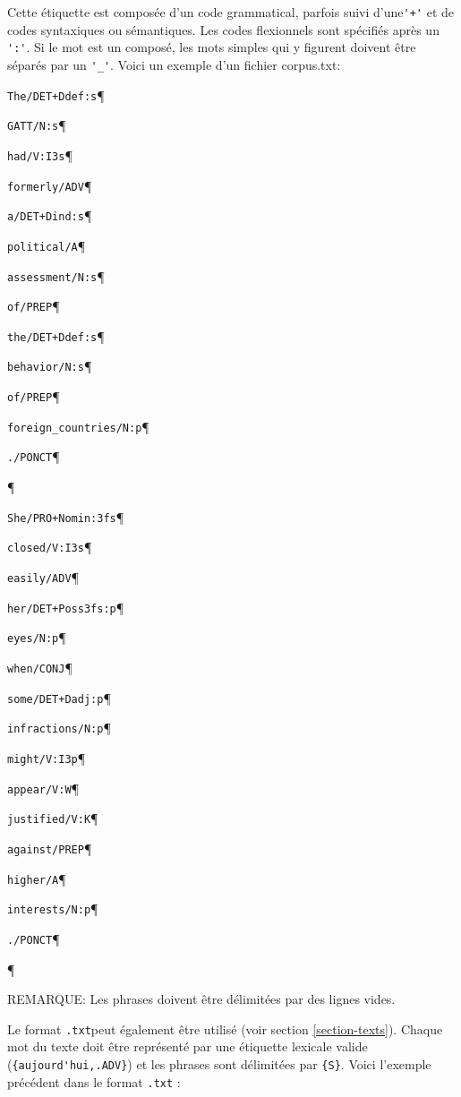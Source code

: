 Cette étiquette est composée d'un code grammatical, parfois suivi d'une\verb$'+'$ et de codes
syntaxiques ou sémantiques. Les codes flexionnels sont spécifiés après un \verb+':'+. Si le mot est
un composé, les mots simples qui y figurent doivent être séparés par un \verb+'_'+. 
Voici un exemple d'un fichier corpus.txt:

\bigskip
\verb$The/DET+Ddef:s$\P

\verb+GATT/N:s+\P

\verb+had/V:I3s+\P

\verb+formerly/ADV+\P

\verb$a/DET+Dind:s$\P

\verb+political/A+\P

\verb+assessment/N:s+\P

\verb+of/PREP+\P

\verb$the/DET+Ddef:s$\P

\verb+behavior/N:s+\P

\verb+of/PREP+\P

\verb+foreign_countries/N:p+\P

\verb+./PONCT+\P

\P

\verb$She/PRO+Nomin:3fs$\P

\verb+closed/V:I3s+\P

\verb+easily/ADV+\P

\verb$her/DET+Poss3fs:p$\P

\verb+eyes/N:p+\P

\verb+when/CONJ+\P

\verb$some/DET+Dadj:p$\P

\verb+infractions/N:p+\P

\verb+might/V:I3p+\P

\verb+appear/V:W+\P

\verb+justified/V:K+\P

\verb+against/PREP+\P

\verb+higher/A+\P

\verb+interests/N:p+\P

\verb+./PONCT+\P

\P

\bigskip
\noindent REMARQUE: Les phrases doivent être délimitées par des lignes vides.

\bigskip
Le format \verb+.txt+peut également être utilisé (voir section \ref{section-texts}). Chaque mot du
texte doit être représenté par une étiquette lexicale valide
(\verb+{aujourd'hui,.ADV}+) et les phrases sont délimitées par
\verb+{S}+.
Voici l'exemple précédent dans le format \verb+.txt+ :

